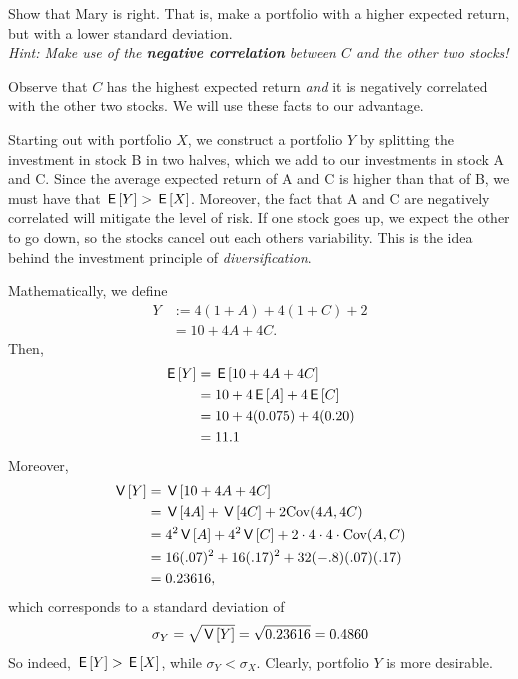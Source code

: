 \begin{exercise}
Show that Mary is right. That is, make a portfolio with a higher expected return, but with a lower standard deviation. \\
\textit{Hint: Make use of the \textbf{negative correlation} between $C$ and the other two stocks!}
\begin{solution}
Observe that $C$ has the highest expected return \textit{and} it is negatively correlated with the other two stocks. We will use these facts to our advantage.

Starting out with portfolio $X$, we construct a portfolio $Y$ by splitting the investment in stock B in two halves, which we add to our investments in stock A and C. Since the average expected return of A and C is higher than that of B, we must have that $\,\mathsf{E}\left[Y\right] > \,\mathsf{E}\left[X\right]$. Moreover, the fact that A and C are negatively correlated will mitigate the level of risk. If one stock goes up, we expect the other to go down, so the stocks cancel out each others variability. This is the idea behind the investment principle of \textit{diversification}.

Mathematically, we define
\begin{align}
    Y &:= 4(1 + A) + 4(1 + C) + 2 \\
    &= 10 + 4A + 4C.
\end{align}
Then,
\begin{align}
    \,\mathsf{E}\left[Y\right] &= \,\mathsf{E}\left[10 + 4A + 4C\right] \\
    &= 10 + 4\,\mathsf{E}\left[A\right] + 4\,\mathsf{E}\left[C\right] \\
    &= 10 + 4(0.075) + 4(0.20) \\
    &= 11.1
\end{align}
Moreover,
\begin{align}
    \,\mathsf{V}\left[Y\right] &= \,\mathsf{V}\left[10 + 4A + 4C\right] \\
    &= \,\mathsf{V}\left[4A\right] + \,\mathsf{V}\left[4C\right] + 2 \text{Cov}(4A, 4C)\\
    &= 4^2\,\mathsf{V}\left[A\right] + 4^2 \,\mathsf{V}\left[C\right] +2 \cdot  4 \cdot 4 \cdot \text{Cov}(A,C) \\
    &= 16 (.07)^2 + 16 (.17)^2  + 32 (-.8)(.07)(.17) \\
    &= 0.23616,
\end{align}
which corresponds to a standard deviation of
\begin{align}
    \sigma_Y = \sqrt{\,\mathsf{V}\left[Y\right]} = \sqrt{0.23616} = 0.4860
\end{align}
So indeed, $\,\mathsf{E}\left[Y\right] > \,\mathsf{E}\left[X\right]$, while $\sigma_Y < \sigma_X$. Clearly, portfolio $Y$ is more desirable.
\end{solution}
\end{exercise}

